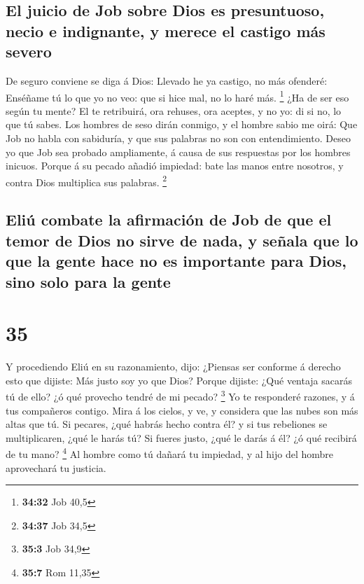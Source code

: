 \hypertarget{el-juicio-de-job-sobre-dios-es-presuntuoso-necio-e-indignante-y-merece-el-castigo-muxe1s-severo}{%
\subsection{El juicio de Job sobre Dios es presuntuoso, necio e
indignante, y merece el castigo más
severo}\label{el-juicio-de-job-sobre-dios-es-presuntuoso-necio-e-indignante-y-merece-el-castigo-muxe1s-severo}}

 De seguro conviene se diga á Dios: Llevado he ya
castigo, no más ofenderé:  Enséñame tú lo que yo no veo:
que si hice mal, no lo haré más. \footnote{\textbf{34:32} Job 40,5}
 ¿Ha de ser eso según tu mente? El te retribuirá, ora
rehuses, ora aceptes, y no yo: di si no, lo que tú sabes.
 Los hombres de seso dirán conmigo, y el hombre sabio me
oirá:  Que Job no habla con sabiduría, y que sus palabras
no son con entendimiento.  Deseo yo que Job sea probado
ampliamente, á causa de sus respuestas por los hombres inicuos.
 Porque á su pecado añadió impiedad: bate las manos entre
nosotros, y contra Dios multiplica sus palabras. \footnote{\textbf{34:37}
  Job 34,5}

\hypertarget{eliuxfa-combate-la-afirmaciuxf3n-de-job-de-que-el-temor-de-dios-no-sirve-de-nada-y-seuxf1ala-que-lo-que-la-gente-hace-no-es-importante-para-dios-sino-solo-para-la-gente}{%
\subsection{Eliú combate la afirmación de Job de que el temor de Dios no
sirve de nada, y señala que lo que la gente hace no es importante para
Dios, sino solo para la
gente}\label{eliuxfa-combate-la-afirmaciuxf3n-de-job-de-que-el-temor-de-dios-no-sirve-de-nada-y-seuxf1ala-que-lo-que-la-gente-hace-no-es-importante-para-dios-sino-solo-para-la-gente}}

\hypertarget{section-34}{%
\section{35}\label{section-34}}

 Y procediendo Eliú en su razonamiento, dijo:
 ¿Piensas ser conforme á derecho esto que dijiste: Más
justo soy yo que Dios?  Porque dijiste: ¿Qué ventaja
sacarás tú de ello? ¿ó qué provecho tendré de mi pecado? \footnote{\textbf{35:3}
  Job 34,9}  Yo te responderé razones, y á tus compañeros
contigo.  Mira á los cielos, y ve, y considera que las
nubes son más altas que tú.  Si pecares, ¿qué habrás hecho
contra él? y si tus rebeliones se multiplicaren, ¿qué le harás tú?
 Si fueres justo, ¿qué le darás á él? ¿ó qué recibirá de
tu mano? \footnote{\textbf{35:7} Rom 11,35}  Al hombre
como tú dañará tu impiedad, y al hijo del hombre aprovechará tu
justicia.

